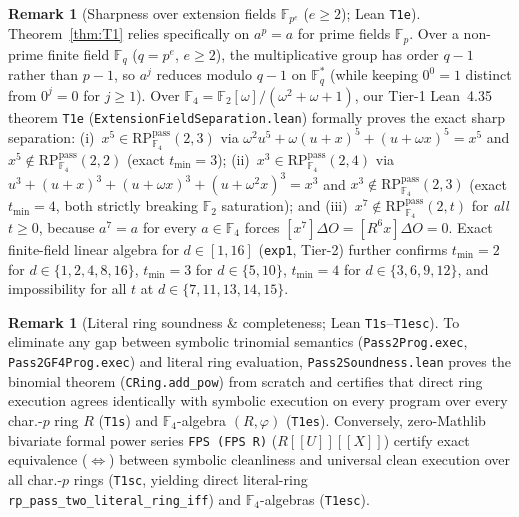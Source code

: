 \documentclass[11pt,reqno]{amsart}
\theoremstyle{definition}
\newtheorem{remark}[theorem]{Remark}
\newcommand{\F}{\mathbb{F}}
\newcommand{\RP}{\mathrm{RP}}
\newcommand{\pass}{\mathrm{pass}}
\begin{document}
\begin{remark}[Sharpness over extension fields $\F_{p^e}$ ($e \ge 2$); Lean \texttt{T1e}]
\label{rem:ext}
Theorem~\ref{thm:T1} relies specifically on $a^p = a$ for prime fields $\F_p$.
Over a non-prime finite field $\F_q$ ($q = p^e$, $e \ge 2$), the multiplicative group has order $q - 1$ rather than $p - 1$, so $a^j$ reduces modulo $q - 1$ on $\F_q^*$ (while keeping $0^0 = 1$ distinct from $0^j = 0$ for $j \ge 1$).
Over $\F_4 = \F_2[\omega]/(\omega^2 + \omega + 1)$, our Tier-1 Lean~4.35 theorem \texttt{T1e} (\texttt{ExtensionFieldSeparation.lean}) formally proves the exact sharp separation:
(i)~$x^5 \in \RP_{\F_4}^{\pass}(2, 3)$ via $\omega^2 u^5 + \omega(u + x)^5 + (u + \omega x)^5 = x^5$ and $x^5 \notin \RP_{\F_4}^{\pass}(2, 2)$ (exact $t_{\min} = 3$);
(ii)~$x^3 \in \RP_{\F_4}^{\pass}(2, 4)$ via $u^3 + (u + x)^3 + (u + \omega x)^3 + (u + \omega^2 x)^3 = x^3$ and $x^3 \notin \RP_{\F_4}^{\pass}(2, 3)$ (exact $t_{\min} = 4$, both strictly breaking $\F_2$ saturation); and
(iii)~$x^7 \notin \RP_{\F_4}^{\pass}(2, t)$ for \emph{all} $t \ge 0$, because $a^7 = a$ for every $a \in \F_4$ forces $[x^7]\Delta O = [R^6 x]\Delta O = 0$.
Exact finite-field linear algebra for $d \in [1, 16]$ (\texttt{exp1}, Tier-2) further confirms $t_{\min} = 2$ for $d \in \{1, 2, 4, 8, 16\}$, $t_{\min} = 3$ for $d \in \{5, 10\}$, $t_{\min} = 4$ for $d \in \{3, 6, 9, 12\}$, and impossibility for all $t$ at $d \in \{7, 11, 13, 14, 15\}$.
\end{remark}

\begin{remark}[Literal ring soundness \& completeness; Lean \texttt{T1s}--\texttt{T1esc}]
\label{rem:soundness}
To eliminate any gap between symbolic trinomial semantics (\texttt{Pass2Prog.\allowbreak exec}, \texttt{Pass2GF4Prog.\allowbreak exec}) and literal ring evaluation, \texttt{Pass2Soundness.\allowbreak lean} proves the binomial theorem (\texttt{CRing.\allowbreak add\_pow}) from scratch and certifies that direct ring execution agrees identically with symbolic execution on every program over every char.-$p$ ring $R$ (\texttt{T1s}) and $\F_4$-algebra $(R, \varphi)$ (\texttt{T1es}).
Conversely, zero-Mathlib bivariate formal power series \texttt{FPS (FPS R)} ($R[[U]][[X]]$) certify exact equivalence ($\Leftrightarrow$) between symbolic cleanliness and universal clean execution over all char.-$p$ rings (\texttt{T1sc}, yielding direct literal-ring \texttt{rp\_pass\_two\_literal\_ring\_iff}) and $\F_4$-algebras (\texttt{T1esc}).
\end{remark}
\end{document}
